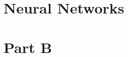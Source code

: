\documentclass[12pt]{article}
\begin{document}
\section{Neural Networks}

\section{Part B}
\end{document}
